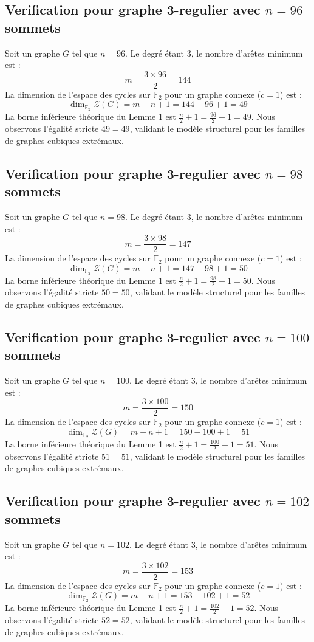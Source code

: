 \documentclass[11pt,a4paper]{article}
\begin{document}
\subsection{Verification pour graphe 3-regulier avec $n=96$ sommets}
Soit un graphe $G$ tel que $n = 96$. Le degré étant 3, le nombre d'arêtes minimum est :
$$ m = \frac{3 \times 96}{2} = 144 $$
La dimension de l'espace des cycles sur $\mathbb{F}_2$ pour un graphe connexe ($c=1$) est :
$$ \dim_{\mathbb{F}_2} \mathcal{Z}(G) = m - n + 1 = 144 - 96 + 1 = 49 $$
La borne inférieure théorique du Lemme 1 est $\frac{n}{2} + 1 = \frac{96}{2} + 1 = 49$.
Nous observons l'égalité stricte $49 = 49$, validant le modèle structurel pour les familles de graphes cubiques extrémaux.

\subsection{Verification pour graphe 3-regulier avec $n=98$ sommets}
Soit un graphe $G$ tel que $n = 98$. Le degré étant 3, le nombre d'arêtes minimum est :
$$ m = \frac{3 \times 98}{2} = 147 $$
La dimension de l'espace des cycles sur $\mathbb{F}_2$ pour un graphe connexe ($c=1$) est :
$$ \dim_{\mathbb{F}_2} \mathcal{Z}(G) = m - n + 1 = 147 - 98 + 1 = 50 $$
La borne inférieure théorique du Lemme 1 est $\frac{n}{2} + 1 = \frac{98}{2} + 1 = 50$.
Nous observons l'égalité stricte $50 = 50$, validant le modèle structurel pour les familles de graphes cubiques extrémaux.

\subsection{Verification pour graphe 3-regulier avec $n=100$ sommets}
Soit un graphe $G$ tel que $n = 100$. Le degré étant 3, le nombre d'arêtes minimum est :
$$ m = \frac{3 \times 100}{2} = 150 $$
La dimension de l'espace des cycles sur $\mathbb{F}_2$ pour un graphe connexe ($c=1$) est :
$$ \dim_{\mathbb{F}_2} \mathcal{Z}(G) = m - n + 1 = 150 - 100 + 1 = 51 $$
La borne inférieure théorique du Lemme 1 est $\frac{n}{2} + 1 = \frac{100}{2} + 1 = 51$.
Nous observons l'égalité stricte $51 = 51$, validant le modèle structurel pour les familles de graphes cubiques extrémaux.

\subsection{Verification pour graphe 3-regulier avec $n=102$ sommets}
Soit un graphe $G$ tel que $n = 102$. Le degré étant 3, le nombre d'arêtes minimum est :
$$ m = \frac{3 \times 102}{2} = 153 $$
La dimension de l'espace des cycles sur $\mathbb{F}_2$ pour un graphe connexe ($c=1$) est :
$$ \dim_{\mathbb{F}_2} \mathcal{Z}(G) = m - n + 1 = 153 - 102 + 1 = 52 $$
La borne inférieure théorique du Lemme 1 est $\frac{n}{2} + 1 = \frac{102}{2} + 1 = 52$.
Nous observons l'égalité stricte $52 = 52$, validant le modèle structurel pour les familles de graphes cubiques extrémaux.
\end{document}
